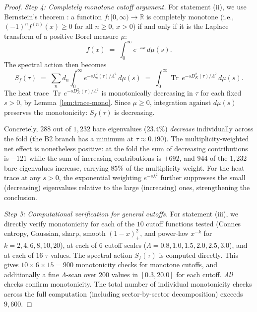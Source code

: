 \documentclass[12pt]{article}
\theoremstyle{definition}
\theoremstyle{remark}
\DeclareMathOperator{\Tr}{Tr}
\begin{document}
\begin{proof}
\medskip\noindent\textit{Step 4: Completely monotone cutoff argument.}
For statement (ii), we use Bernstein's theorem
\cite{SchillingSongVondracek2012}: a function
$f : [0,\infty) \to \mathbb{R}$ is completely monotone (i.e.,
$(-1)^n f^{(n)}(x) \geq 0$ for all $n \geq 0$, $x > 0$) if and only
if it is the Laplace transform of a positive Borel measure $\mu$:
\begin{equation}
  f(x) \;=\; \int_0^\infty e^{-sx}\, d\mu(s).
\end{equation}
The spectral action then becomes
\begin{equation}
  S_f(\tau) \;=\; \sum_n d_n \int_0^\infty
  e^{-s\lambda_n^2(\tau)/\Lambda^2}\, d\mu(s)
  \;=\; \int_0^\infty \Tr\, e^{-s D_K^2(\tau)/\Lambda^2}\, d\mu(s).
\end{equation}
The heat trace $\Tr\, e^{-s D_K^2(\tau)/\Lambda^2}$ is monotonically
decreasing in $\tau$ for each fixed $s > 0$, by
Lemma~\ref{lem:trace-mono}.  Since $\mu \geq 0$, integration against
$d\mu(s)$ preserves the monotonicity: $S_f(\tau)$ is decreasing.

Concretely, $288$ out of $1{,}232$ bare eigenvalues ($23.4\%$)
\emph{decrease} individually across the fold (the B2 branch has a
minimum at $\tau \approx 0.190$).  The multiplicity-weighted net
effect is nonetheless positive: at the fold the sum of decreasing
contributions is $-121$ while the sum of increasing contributions is
$+692$, and $944$ of the $1{,}232$ bare eigenvalues increase, carrying
$85\%$ of the multiplicity weight.  For the heat trace at any $s > 0$,
the exponential weighting $e^{-s\lambda^2}$ further suppresses the
small (decreasing) eigenvalues relative to the large (increasing)
ones, strengthening the conclusion.

\medskip\noindent\textit{Step 5: Computational verification for
general cutoffs.}
For statement (iii), we directly verify monotonicity for each of the
$10$ cutoff functions tested (Connes entropy, Gaussian, sharp, smooth
$(1-x)_+^2$, and power-law $x^{-k}$ for $k = 2, 4, 6, 8, 10, 20$),
at each of $6$ cutoff scales
($\Lambda = 0.8, 1.0, 1.5, 2.0, 2.5, 3.0$), and at each of $16$
$\tau$-values.  The spectral action $S_f(\tau)$ is computed directly.
This gives $10 \times 6 \times 15 = 900$ monotonicity checks for
monotone cutoffs, and additionally a fine $\Lambda$-scan over $200$
values in $[0.3, 20.0]$ for each cutoff.  \emph{All} checks confirm
monotonicity.  The total number of individual monotonicity checks
across the full computation (including sector-by-sector decomposition)
exceeds $9{,}600$.


\end{proof}
\end{document}
